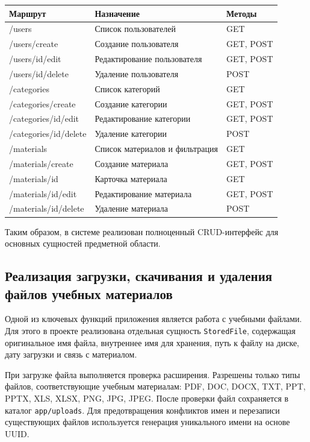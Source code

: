 \begin{center}
\footnotesize\begin{tabularx}{0.96\textwidth}{>{\raggedright\arraybackslash}p{6.0cm} >{\raggedright\arraybackslash}X >{\raggedright\arraybackslash}p{1.6cm}}
\toprule
\textbf{Маршрут} & \textbf{Назначение} & \textbf{Методы} \\
\midrule
/users & Список пользователей & GET \\
/users/create & Создание пользователя & GET, POST \\
/users/{id}/edit & Редактирование пользователя & GET, POST \\
/users/{id}/delete & Удаление пользователя & POST \\
/categories & Список категорий & GET \\
/categories/create & Создание категории & GET, POST \\
/categories/{id}/edit & Редактирование категории & GET, POST \\
/categories/{id}/delete & Удаление категории & POST \\
/materials & Список материалов и фильтрация & GET \\
/materials/create & Создание материала & GET, POST \\
/materials/{id} & Карточка материала & GET \\
/materials/{id}/edit & Редактирование материала & GET, POST \\
/materials/{id}/delete & Удаление материала & POST \\
\bottomrule
\end{tabularx}
\end{center}

Таким образом, в системе реализован полноценный CRUD-интерфейс для основных сущностей предметной области.

\subsection{Реализация загрузки, скачивания и удаления файлов учебных материалов}

Одной из ключевых функций приложения является работа с учебными файлами. Для этого в проекте реализована отдельная сущность \texttt{StoredFile}, содержащая оригинальное имя файла, внутреннее имя для хранения, путь к файлу на диске, дату загрузки и связь с материалом.

При загрузке файла выполняется проверка расширения. Разрешены только типы файлов, соответствующие учебным материалам: PDF, DOC, DOCX, TXT, PPT, PPTX, XLS, XLSX, PNG, JPG, JPEG. После проверки файл сохраняется в каталог \texttt{app/uploads}. Для предотвращения конфликтов имен и перезаписи существующих файлов используется генерация уникального имени на основе UUID.

